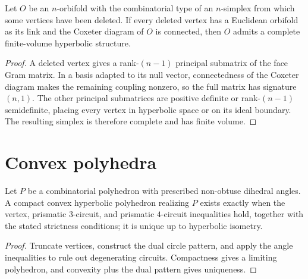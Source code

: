 \begin{theorem}
\label{thurston-ch13-deleted-simplex-hyperbolization}

Let $O$ be an $n$-orbifold with the combinatorial type of an $n$-simplex from
which some vertices have been deleted.  If every deleted vertex has a
Euclidean orbifold as its link and the Coxeter diagram of $O$ is connected,
then $O$ admits a complete finite-volume hyperbolic structure.
\end{theorem}
\begin{proof}
\sketch A deleted vertex gives a rank-$(n-1)$ principal submatrix of the face
Gram matrix.  In a basis adapted to its null vector, connectedness of the
Coxeter diagram makes the remaining coupling nonzero, so the full matrix has
signature $(n,1)$.  The other principal submatrices are positive definite or
rank-$(n-1)$ semidefinite, placing every vertex in hyperbolic space or on its
ideal boundary.  The resulting simplex is therefore complete and has finite
volume.
\end{proof}

\section{Convex polyhedra}

\begin{theorem}
\label{thurston-ch13-andreev}

Let $P$ be a combinatorial polyhedron with prescribed non-obtuse dihedral
angles.  A compact convex hyperbolic polyhedron realizing $P$ exists exactly
when the vertex, prismatic $3$-circuit, and prismatic $4$-circuit inequalities
hold, together with the stated strictness conditions; it is unique up to
hyperbolic isometry.
\end{theorem}
\begin{proof}
\sketch Truncate vertices, construct the dual circle pattern, and apply the
angle inequalities to rule out degenerating circuits.  Compactness gives a
limiting polyhedron, and convexity plus the dual pattern gives uniqueness.
\end{proof}

